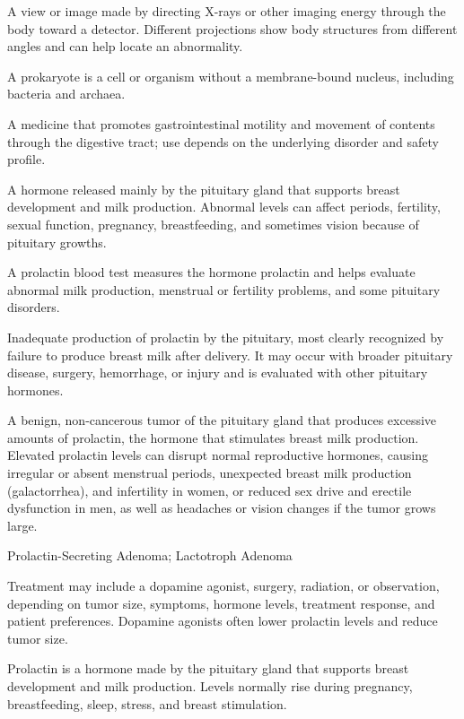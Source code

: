  A view or image made by directing X-rays or other imaging energy through the body toward a detector. Different projections show body structures from different angles and can help locate an abnormality.

 A prokaryote is a cell or organism without a membrane-bound nucleus, including bacteria and archaea.

 A medicine that promotes gastrointestinal motility and movement of contents through the digestive tract; use depends on the underlying disorder and safety profile.

 A hormone released mainly by the pituitary gland that supports breast development and milk production. Abnormal levels can affect periods, fertility, sexual function, pregnancy, breastfeeding, and sometimes vision because of pituitary growths.

 A prolactin blood test measures the hormone prolactin and helps evaluate abnormal milk production, menstrual or fertility problems, and some pituitary disorders.

 Inadequate production of prolactin by the pituitary, most clearly recognized by failure to produce breast milk after delivery. It may occur with broader pituitary disease, surgery, hemorrhage, or injury and is evaluated with other pituitary hormones.

 A benign, non-cancerous tumor of the pituitary gland that produces excessive amounts of prolactin, the hormone that stimulates breast milk production. Elevated prolactin levels can disrupt normal reproductive hormones, causing irregular or absent menstrual periods, unexpected breast milk production (galactorrhea), and infertility in women, or reduced sex drive and erectile dysfunction in men, as well as headaches or vision changes if the tumor grows large.

\synonyms
Prolactin-Secreting Adenoma; Lactotroph Adenoma

 Treatment may include a dopamine agonist, surgery, radiation, or observation,
depending on tumor size, symptoms, hormone levels, treatment response, and patient preferences. Dopamine agonists often
lower prolactin levels and reduce tumor size.

 Prolactin is a hormone made by the pituitary gland that supports breast development and milk production. Levels normally rise during pregnancy, breastfeeding, sleep, stress, and breast stimulation.

